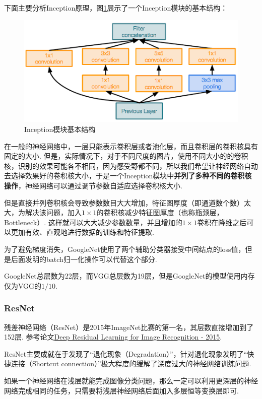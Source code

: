 \documentclass[12pt, a4paper, oneside]{ctexart}
\numberwithin{equation}{section}  %
\begin{document}
下面主要分析Inception原理，图\ref{fig-Inception}展示了一个Inception模块的基本结构：
\begin{figure}[htbp]
  \centering
  \includegraphics[scale=0.3]{Inception.png}
  \caption{Inception模块基本结构}
  \label{fig-Inception}
\end{figure}

在一般的神经网络中，一层只能表示卷积层或者池化层，而且卷积层的卷积核具有固定的大小. 但是，实际情况下，对于不同尺度的图片，使用不同大小的的卷积核，识别的效果可能各不相同，因为感受野都不同，所以我们希望让神经网络自动去选择效果好的卷积核大小，于是一个Inception模块中\textbf{并列了多种不同的卷积核操作}，神经网络可以通过调节参数自适应选择卷积核大小.

但是直接并列卷积核会导致参数数目大大增加，特征图厚度（即通道数个数）太大，为解决该问题，加入$1\times 1$的卷积核减少特征图厚度（也称瓶颈层，Bottleneck）. 这样就可以大大减少参数数量，并且增加的$1\times 1$卷积在降维之后可以更加有效、直观地进行数据的训练和特征提取.

为了避免梯度消失，GoogleNet使用了两个辅助分类器接受中间结点的loss值，但是后面发明的batch归一化操作可以代替这个部分.

GoogleNet总层数为22层，而VGG总层数为19层，但是GoogleNet的模型使用内存仅为VGG的$1/10$.

\subsubsection{ResNet}

残差神经网络（ResNet）是2015年ImageNet比赛的第一名，其层数直接增加到了152层. 参考论文\href{https://arxiv.org/pdf/1512.03385.pdf}{Deep Residual Learning for Image Recognition - 2015}.

ResNet主要成就在于发现了“退化现象（Degradation）”，针对退化现象发明了“快捷连接（Shortcut connection）”极大程度的缓解了深度过大的神经网络训练问题.

如果一个神经网络在浅层就能完成图像分类问题，那么一定可以利用更深层的神经网络完成相同的任务，只需要将浅层神经网络后面加入多层恒等变换层即可.
\end{document}
